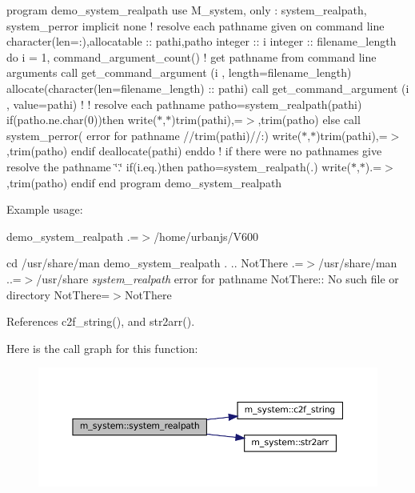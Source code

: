 program demo\+\_\+system\+\_\+realpath use M\+\_\+system, only \+: system\+\_\+realpath, system\+\_\+perror implicit none ! resolve each pathname given on command line character(len=\+:),allocatable \+:\+: pathi,patho integer \+:\+: i integer \+:\+: filename\+\_\+length do i = 1, command\+\_\+argument\+\_\+count() ! get pathname from command line arguments call get\+\_\+command\+\_\+argument (i , length=filename\+\_\+length) allocate(character(len=filename\+\_\+length) \+:\+: pathi) call get\+\_\+command\+\_\+argument (i , value=pathi) ! ! resolve each pathname patho=system\+\_\+realpath(pathi) if(patho.\+ne.\+char(0))then write($\ast$,$\ast$)trim(pathi),\textquotesingle{}=$>$\textquotesingle{},trim(patho) else call system\+\_\+perror( error for pathname \textquotesingle{}//trim(pathi)//\textquotesingle{}\+:\textquotesingle{}) write($\ast$,$\ast$)trim(pathi),\textquotesingle{}=$>$\textquotesingle{},trim(patho) endif deallocate(pathi) enddo ! if there were no pathnames give resolve the pathname \char`\"{}.\char`\"{} if(i.\+eq.)then patho=system\+\_\+realpath(\textquotesingle{}.\textquotesingle{}) write($\ast$,$\ast$)\textquotesingle{}.=$>$\textquotesingle{},trim(patho) endif end program demo\+\_\+system\+\_\+realpath

Example usage\+:

demo\+\_\+system\+\_\+realpath .=$>$/home/urbanjs/\+V600

cd /usr/share/man demo\+\_\+system\+\_\+realpath . .. Not\+There .=$>$/usr/share/man ..=$>$/usr/share {\itshape system\+\_\+realpath} error for pathname Not\+There\+:\+: No such file or directory Not\+There=$>$Not\+There 

References c2f\+\_\+string(), and str2arr().

Here is the call graph for this function\+:
\nopagebreak
\begin{figure}[H]
\begin{center}
\leavevmode
\includegraphics[width=350pt]{namespacem__system_a70bbfa0a0be084b9717cbc04408041fc_cgraph}
\end{center}
\end{figure}
\mbox{\label{namespacem__system_a730ae64294e3cd73bde8f0c63cdf9972}} 
